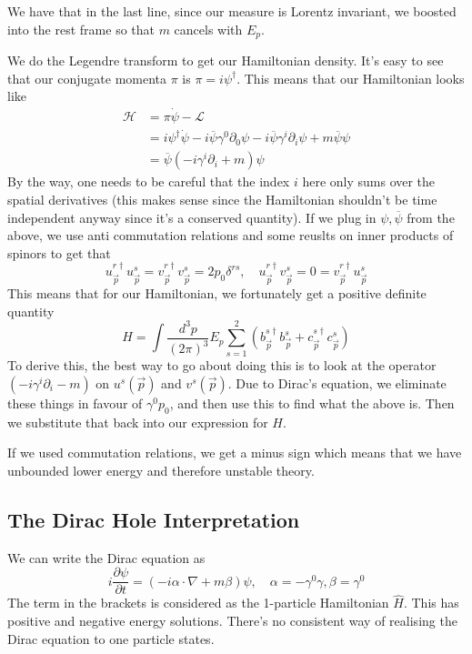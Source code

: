 We have that in the last line, since our measure 
is Lorentz invariant, we boosted into 
the rest frame so that $ m $ cancels with $ E_{ p }  $. 


We do the Legendre transform to 
get our Hamiltonian density. It's easy to 
see that our conjugate momenta $ \pi $ is 
$ \pi = i \psi^{ \dagger } $. This means that 
our Hamiltonian looks like 
\begin{align*}
\mathcal{ H } &=  \pi \dot{ \psi }  - \mathcal{ L }   \\
&=  i \psi ^ \dagger \dot{ \psi }  - i \overline{ \psi } \gamma ^ 0 \partial  _ 0 
\psi - i \overline{ \psi } \gamma ^ i \partial  _ i \psi + m \overline{ \psi } \psi \\
&=  \overline{ \psi }( - i \gamma ^ i \partial  _ i + m ) \psi  
\end{align*}
By the way, one needs to be careful that 
the index $ i $ here only sums over the spatial 
derivatives (this makes sense since the 
Hamiltonian shouldn't be time independent anyway 
since it's a conserved quantity). 
If we plug in $ \psi , \overline{ \psi } $ from the above, 
we use anti commutation relations and some reuslts on inner 
products of spinors to get that 
\[
u _{ \vec{p} } ^{ r \dagger } u _{ \vec{p} } ^ s  = 
v_{\vec{p} } ^{ r \dagger } v _{ \vec{p} } ^ s  = 2 p_0 \delta ^{ rs } , \quad 
u_{\vec{p} } ^{  r\dagger } v_{\vec{p} } ^ s = 0 = v_{ \vec{p} } ^{ r \dagger  } u_{ \vec{p} } ^ s 
\] 
This means that for our Hamiltonian, 
we fortunately get a positive definite quantity
\[
H = \int \frac{ d^ 3 p }{ ( 2 \pi ) ^ 3 } E _ p \sum_{ s = 1 } ^ 2 
\left(  b_{ \vec{p} } ^{ s \dagger  } b _{ \vec{p} } ^ s 
+ c _{ \vec{p} } ^{ s \dagger } c _{ \vec{p} } ^ s \right) 
\] To derive this, the best way to go about doing this 
is to look at the operator $ \left( - i \gamma ^ i \partial _ i   - m  \right)  $
on $ u ^ s ( \vec{p} )  $ and $ v ^ s ( \vec{p} )  $.
Due to Dirac's equation, we eliminate these 
things in favour of $ \gamma ^ 0 p _ 0 $, 
and then use this to find what the above is. 
Then we substitute that back into our expression for $ H$. 

If we used commutation relations, we get a minus sign which means that we 
have unbounded lower energy and therefore unstable theory.

\subsection{The Dirac Hole Interpretation}
We can write the Dirac equation as 
\[
i \frac{\partial  \psi }{\partial  t }   = 
( - i \alpha \cdot  \nabla + m \beta ) \psi , \quad \alpha =  - \gamma ^ 0 \gamma , \beta = \gamma ^ 0 
\] The term in the brackets is considered as 
the 1-particle Hamiltonian $ \hat{ H } $. 
This has positive and negative energy solutions. 
There's no consistent way of realising the 
Dirac equation to one particle states.

